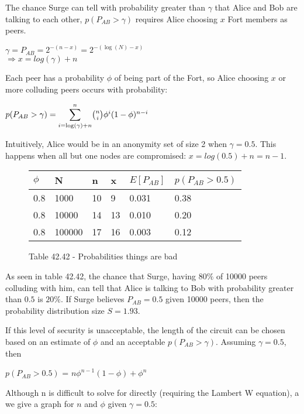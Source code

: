 \documentclass[twocolumn,11pt,english]{article}
\begin{document}
The chance Surge can tell with probability greater than $\gamma$ that Alice and Bob are talking to each other, $p(P_{AB} > \gamma)$ requires Alice choosing $x$ Fort members as peers. 
\begin{center}
$\gamma = P_{AB} = 2^{-(n - x)} = 2^{-(\log(N) - x)}$
\\ $ \Rightarrow x = log( \gamma ) + n$
\end{center}
Each peer has a probability $\phi$ of being part of the Fort, so Alice choosing $x$ or more colluding peers occurs with probability:
\begin{center}
 $p(P_{AB} > \gamma) = \mathlarger{\sum}\limits_{i=\log(\gamma) + n}^n {n \choose i} \phi^i (1 - \phi )^{n-i}$

\end{center}

Intuitively, Alice would be in an anonymity set of size 2 when $\gamma = 0.5$. This happens when all but one nodes are compromised: $x = log( 0.5 ) + n = n - 1$. 

\begin{figure}[ht]
  \small
  \begin{tabular}{| l | l | l | l | l | l |}

    \hline
    $\phi$ & N & n & x & $E[P_{AB}]$ & $p(P_{AB} > 0.5)$ \\\hline
    0.8 & 1000 & 10 & 9 & 0.031 & 0.38\\
    0.8 & 10000 & 14 & 13 & 0.010 & 0.20\\
    0.8 & 100000 & 17 & 16 & 0.003 & 0.12\\
    \hline
  \end{tabular}
  \caption{Table 42.42 - Probabilities things are bad}
\end{figure}

\newpage
As seen in table 42.42, the chance that Surge, having $80\%$ of 10000 peers colluding with him, can tell that Alice is talking to Bob with probability greater than $0.5$ is $20\%$. If Surge believes $P_{AB} = 0.5$ given 10000 peers, then the probability distribution size $S = 1.93$. 

If this level of security is unacceptable, the length of the circuit can be chosen based on an estimate of $\phi$ and an acceptable $p(P_{AB} > \gamma)$. Assuming $\gamma = 0.5$, then 
\begin{center}
$p(P_{AB} > 0.5)$ = $n\phi^{n-1} (1 - \phi ) + \phi^n $
\end{center}

Although n is difficult to solve for directly (requiring the Lambert W equation), a we give a graph for $n$ and $\phi$ given $\gamma = 0.5$:
\end{document}
